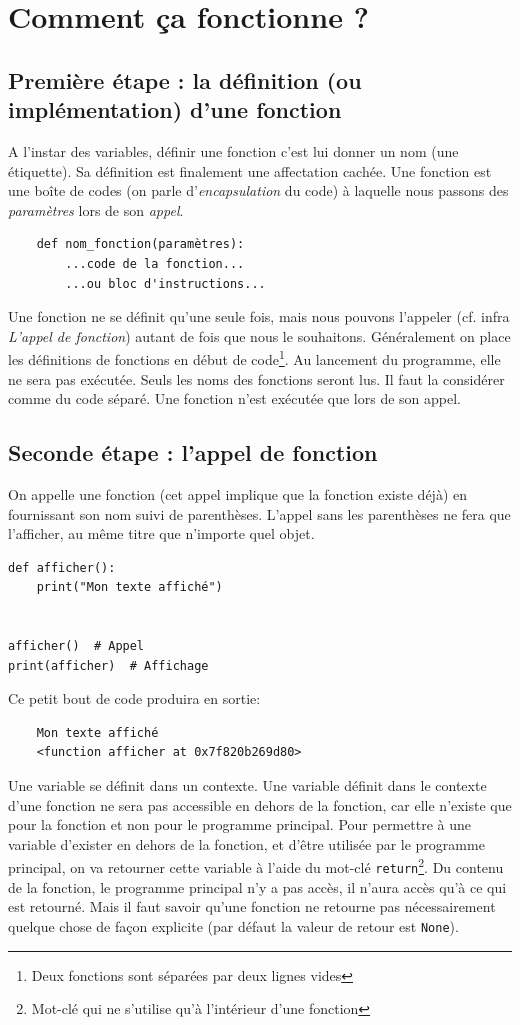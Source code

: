 \documentclass[a4paper,11pt]{book}
\begin{document}
\section{Comment ça fonctionne ?}
\subsection*{Première étape : la définition (ou implémentation) d'une fonction}
A l'instar des variables, définir une fonction c'est lui donner un nom (une étiquette). Sa définition est finalement une affectation cachée. Une fonction est une boîte de codes (on parle d'\textit{encapsulation} du code) à laquelle nous passons des \textit{paramètres} lors de son \textit{appel}.
\begin{verbatim}
    def nom_fonction(paramètres):
        ...code de la fonction...
        ...ou bloc d'instructions...
\end{verbatim}
\medskip

Une fonction ne se définit qu'une seule fois, mais nous pouvons l'appeler (cf. infra \textit{L'appel de fonction}) autant de fois que nous le souhaitons. Généralement on place les définitions de fonctions en début de code\footnote{Deux fonctions sont séparées par deux lignes vides}. Au lancement du programme, elle ne sera pas exécutée. Seuls les noms des fonctions seront lus. Il faut la considérer comme du code séparé. Une fonction n'est exécutée que lors de son appel.

\subsection*{Seconde étape : l'appel de fonction}
On appelle une fonction (cet appel implique que la fonction existe déjà) en fournissant son nom suivi de parenthèses. L'appel sans les parenthèses ne fera que l'afficher, au même titre que n'importe quel objet.
\medskip

\begin{lstlisting}[caption=Utiliser une fonction]
def afficher():
    print("Mon texte affiché")


afficher()  # Appel
print(afficher)  # Affichage
\end{lstlisting}
\medskip

Ce petit bout de code produira en sortie:
\begin{verbatim}
    Mon texte affiché
    <function afficher at 0x7f820b269d80>
\end{verbatim}
\medskip

Une variable se définit dans un contexte. Une variable définit dans le contexte d'une fonction ne sera pas accessible en dehors de la fonction, car elle n'existe que pour la fonction et non pour le programme principal. Pour permettre à une variable d'exister en dehors de la fonction, et d'être utilisée par le programme principal, on va retourner cette variable à l'aide du mot-clé \texttt{return}\footnote{Mot-clé qui ne s'utilise qu'à l'intérieur d'une fonction}. Du contenu de la fonction, le programme principal n'y a pas accès, il n'aura accès qu'à ce qui est retourné. Mais il faut savoir qu'une fonction ne retourne pas nécessairement quelque chose de façon explicite (par défaut la valeur de retour est \texttt{None}).
\medskip
\end{document}
